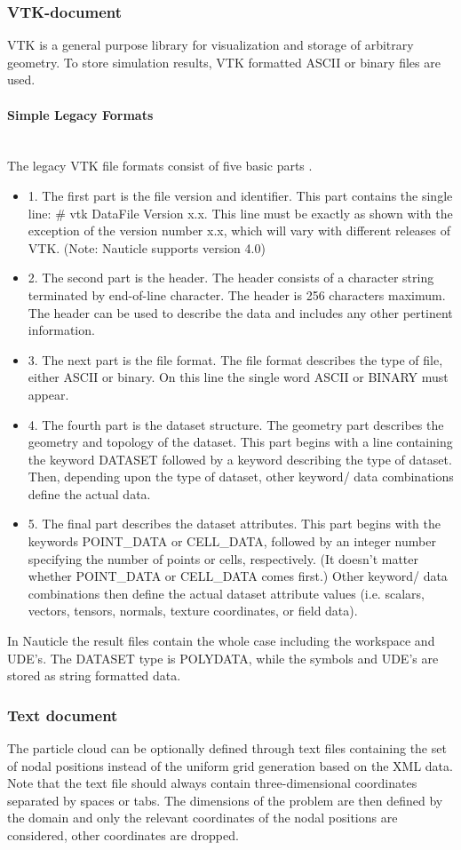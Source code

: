 \documentclass[a4paper,12pt,openany]{book}
\newcommand{\myparagraph}[1]{\paragraph{#1}\mbox{}\\\noindent}
\theoremstyle{break}
\begin{document}
\subsubsection{VTK-document}
VTK is a general purpose library for visualization and storage of arbitrary geometry. To store simulation results, VTK formatted ASCII or binary files are used.
\myparagraph{Simple Legacy Formats}
The legacy VTK file formats consist of five basic parts \cite{VTK_format}.
\begin{itemize}
\item 1. The first part is the file version and identifier. This part contains the single line: \# vtk DataFile Version x.x. This line must be exactly as shown with the exception of the version number x.x, which will vary with different releases of VTK. (Note: Nauticle supports version 4.0) 
\item 2. The second part is the header. The header consists of a character string terminated by end-of-line character. The header is 256 characters maximum. The header can be used to describe the data and includes any other pertinent information. 
\item 3. The next part is the file format. The file format describes the type of file, either ASCII or binary. On this line the single word ASCII or BINARY must appear. 
\item 4. The fourth part is the dataset structure. The geometry part describes the geometry and topology of the dataset. This part begins with a line containing the keyword DATASET followed by a keyword describing the type of dataset. Then, depending upon the type of dataset, other keyword/ data combinations define the actual data.
\item 5. The final part describes the dataset attributes. This part begins with the keywords POINT\_DATA or CELL\_DATA, followed by an integer number specifying the number of points or cells, respectively. (It doesn't matter whether POINT\_DATA or CELL\_DATA comes first.) Other keyword/ data combinations then define the actual dataset attribute values (i.e. scalars, vectors, tensors, normals, texture coordinates, or field data). 
\end{itemize}
In Nauticle the result files contain the whole case including the workspace and UDE's. The DATASET type is POLYDATA, while the symbols and UDE's are stored as string formatted data.
\subsubsection{Text document}
The particle cloud can be optionally defined through text files containing the set of nodal positions instead of the uniform grid generation based on the XML data. Note that the text file should always contain three-dimensional coordinates separated by spaces or tabs. The dimensions of the problem are then defined by the domain and only the relevant coordinates of the nodal positions are considered, other coordinates are dropped.
\end{document}
